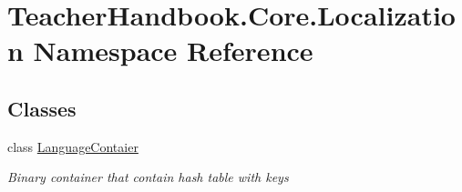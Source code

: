 \hypertarget{namespace_teacher_handbook_1_1_core_1_1_localization}{}\section{Teacher\+Handbook.\+Core.\+Localization Namespace Reference}
\label{namespace_teacher_handbook_1_1_core_1_1_localization}
\subsection*{Classes}
\begin{DoxyCompactItemize}
\item 
class \mbox{\hyperlink{class_teacher_handbook_1_1_core_1_1_localization_1_1_language_contaier}{Language\+Contaier}}
\begin{DoxyCompactList}\small\item\em Binary container that contain hash table with keys \end{DoxyCompactList}\end{DoxyCompactItemize}

